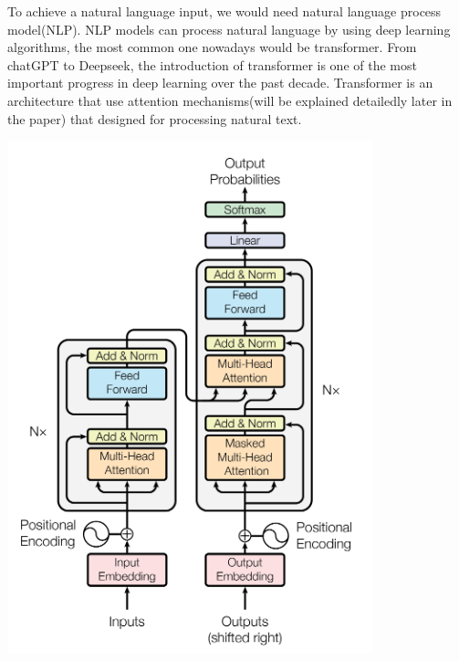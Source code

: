                     To achieve a natural language input, we would need natural language process model(NLP). NLP models can process natural language by using deep learning algorithms, the most common one nowadays would be transformer. From chatGPT to Deepseek, the introduction of transformer is one of the most important progress in deep learning over the past decade. Transformer is an architecture that use attention mechanisms(will be explained detailedly later in the paper) that designed for processing natural text.
                    \begin{Figure}
                        \centering
                        \includegraphics[width=\linewidth]{Image/Transformer.png}
                    \end{Figure}

